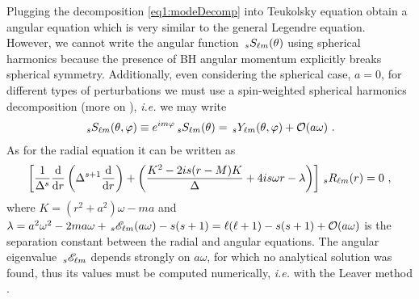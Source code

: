 Plugging the decomposition \eqref{eq1:modeDecomp} into Teukolsky equation \cite{Teukolsky1972} obtain a angular equation which is very similar to the general Legendre equation. However, we cannot write the angular function $\uu[s]{S}{\ell m}(\theta)$ using spherical harmonics because the presence of BH angular momentum explicitly breaks spherical symmetry. Additionally, even considering the spherical case, $a=0$, for different types of perturbations we must use a spin-weighted spherical harmonics decomposition (more on \cite{TorresdelCastillo2003}), \emph{i.e.} we may write
\begin{align}
    \uu[s]{S}{\ell m}(\theta, \varphi) \equiv e^{i m \varphi} \uu[s]{S}{\ell m}(\theta) = \uu[s]{Y}{\ell m}(\theta, \varphi) + \mathcal{O}(a \omega) ~.
\end{align}
As for the radial equation it can be written as
\begin{align}
    \left[ \frac{1}{\Delta^s} \frac{\dd}{\dd r} \left( \Delta^{s+1} \frac{\dd}{\dd r}  \right) + \left( \frac{K^2 - 2 i s(r-M) K}{\Delta} + 4 i s \omega r - \lambda \right) \right] \uu[s]{R}{\ell m}(r) = 0 ~,
\end{align}
where $K=(r^2+a^2)\omega - m a$ and $\lambda = a^2 \omega^2 - 2 m a \omega + \uu[s]{\mathscr{E}}{\ell m}(a\omega) - s(s+1) = \ell(\ell+1)-s(s+1)+\mathcal{O}(a \omega)$ is the separation constant between the radial and angular equations. The angular eigenvalue $\uu[s]{\mathscr{E}}{\ell m}$ depends strongly on $a \omega$, for which no analytical solution was found, thus its values must be computed numerically, \emph{i.e.} with the Leaver method \cite{Leaver1985,Leaver1986}.


\clearpage